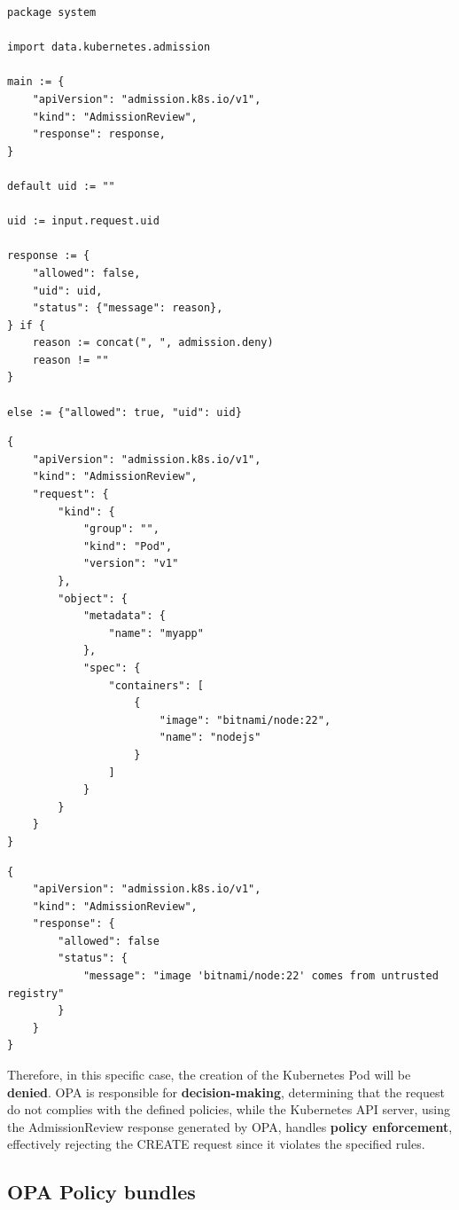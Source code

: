 \begin{lstlisting}[language=Rego, caption={Rego ``root" policy (system.main)}]
package system

import data.kubernetes.admission

main := {
	"apiVersion": "admission.k8s.io/v1",
	"kind": "AdmissionReview",
	"response": response,
}

default uid := ""

uid := input.request.uid

response := {
	"allowed": false,
	"uid": uid,
	"status": {"message": reason},
} if {
	reason := concat(", ", admission.deny)
	reason != ""
}

else := {"allowed": true, "uid": uid}
\end{lstlisting}


\newpage
\lstset{style=jsonstyle}
\begin{lstlisting}[caption={AdmissionReview request}]
{
    "apiVersion": "admission.k8s.io/v1",
    "kind": "AdmissionReview",
    "request": {
        "kind": {
            "group": "",
            "kind": "Pod",
            "version": "v1"
        },
        "object": {
            "metadata": {
                "name": "myapp"
            },
            "spec": {
                "containers": [
                    {
                        "image": "bitnami/node:22",
                        "name": "nodejs"
                    }
                ]
            }
        }
    }
}
\end{lstlisting}

\lstset{style=jsonstyle}
\begin{lstlisting}[caption={AdmissionReview response}]
{
    "apiVersion": "admission.k8s.io/v1",
    "kind": "AdmissionReview",
    "response": {
        "allowed": false
        "status": {
            "message": "image 'bitnami/node:22' comes from untrusted registry"
        }
    }
}
\end{lstlisting}

Therefore, in this specific case, the creation of the Kubernetes Pod will be \textbf{denied}. OPA is responsible for \textbf{decision-making}, determining that the request do not complies with the defined policies, while the Kubernetes API server, using the AdmissionReview response generated by OPA, handles \textbf{policy enforcement}, effectively rejecting the CREATE request since it violates the specified rules.

\subsection{OPA Policy bundles}
\label{sec:opa_bundles}

